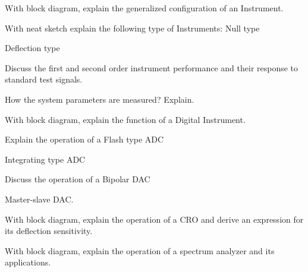 \markB

\newpage \again

\partC

\item  With block diagram, explain the generalized configuration of an Instrument.
\Or
\item With neat sketch explain the following type of Instruments:
\iitem Null type
\item Deflection type
\ene

\item  Discuss the first and second order instrument performance and their response
  to standard test signals.
\Or
\item \iitem How the system parameters are measured? Explain.
\item With block diagram, explain the function of a Digital Instrument.
\ene 

\item Explain the operation of a
\iitem Flash type ADC
\item Integrating type ADC
\ene
\Or
\item Discuss the operation of a
\iitem Bipolar DAC
\item Master-slave DAC.
\ene

\item  With block diagram, explain the operation of a CRO and derive an
  expression for its deflection sensitivity.
\Or
\item With block diagram, explain the operation of a spectrum analyzer and its applications.

\markC
\ene
